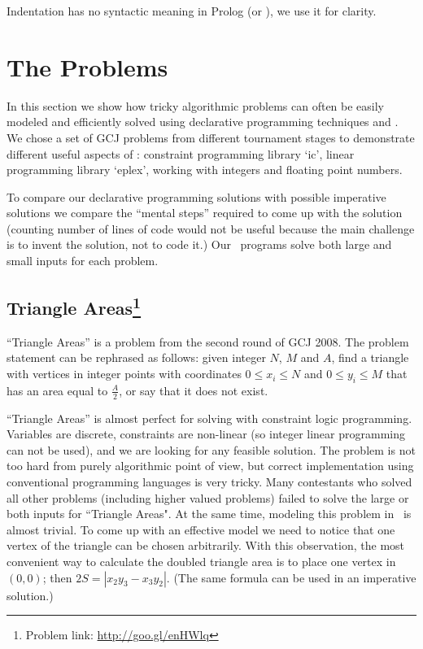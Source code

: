 \documentclass{acm_proc_article-sp}
\begin{document}
Indentation has no syntactic meaning in Prolog (or \eclipse), we use it for clarity.

\section{The Problems}

In this section we show how tricky algorithmic problems can often be easily modeled and efficiently solved using declarative programming techniques and \eclipse.
We chose a set of GCJ problems from different tournament stages to demonstrate different useful aspects of \eclipse: constraint programming library `ic', 
linear programming library `eplex', working with integers and floating point numbers.

To compare our declarative programming solutions with possible imperative solutions we compare the ``mental steps'' required to come up with the solution
(counting number of lines of code would not be useful because the main challenge is to invent the solution, not to code it.) 
Our \eclipse\ programs solve both large and small inputs for each problem.

\subsection*{Triangle Areas\footnote{Problem link: \url{http://goo.gl/enHWlq}}}

``Triangle Areas'' is a problem from the second round of GCJ 2008.
The problem statement can be rephrased as follows: given integer $N$, $M$ and $A$, find a
triangle with vertices in integer points with coordinates $0 \leq x_i \leq N$
and $0 \leq y_i \leq M$ that has an area equal to $\frac{A}{2}$, or say that it does not exist.

``Triangle Areas'' is almost perfect for solving with constraint logic programming. 
Variables are discrete, constraints are non-linear (so integer linear programming can not be used), and we are looking for any feasible solution.
The problem is not too hard from purely algorithmic point of view, but correct implementation using conventional programming languages is very tricky.
Many contestants who solved all other problems (including higher valued problems) failed to solve the large or both inputs for ``Triangle Areas".
At the same time, modeling this problem in \eclipse\ is almost trivial. 
To come up with an effective model we need to notice that one vertex of the triangle can be chosen arbitrarily.
With this observation, the most convenient way to calculate the doubled triangle area is to place one vertex in $(0,0)$; then $2S = |x_2y_3 - x_3y_2|$. 
(The same formula can be used in an imperative solution.)
\end{document}
